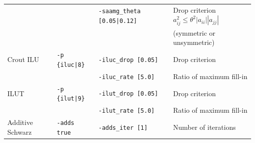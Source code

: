 \documentclass[a4paper]{article}
\begin{document}
\begin{minipage}[t]{\textwidth}
\begin{center}
\begin{tabular}{l|lll}
         &                       & \verb=-saamg_theta [0.05|0.12]= & Drop criterion $a^2_{ij}\le\theta^2|a_{ii}||a_{jj}|$ \\
         &                       &                             & (symmetric or unsymmetric) \\
Crout ILU& \verb=-p {iluc|8}=    & \verb=-iluc_drop [0.05]=    & Drop criterion    \\
         &                       & \verb=-iluc_rate [5.0]=     & Ratio of maximum fill-in \\
ILUT     & \verb=-p {ilut|9}=    & \verb=-ilut_drop [0.05]=    & Drop criterion    \\
         &                       & \verb=-ilut_rate [5.0]=     & Ratio of maximum fill-in \\
Additive Schwarz  & \verb=-adds true=   &  \verb=-adds_iter [1]= & Number of iterations   \\
\hline         
\end{tabular}
\end{center}
\end{minipage}
\\ \\
\newpage
\end{document}
